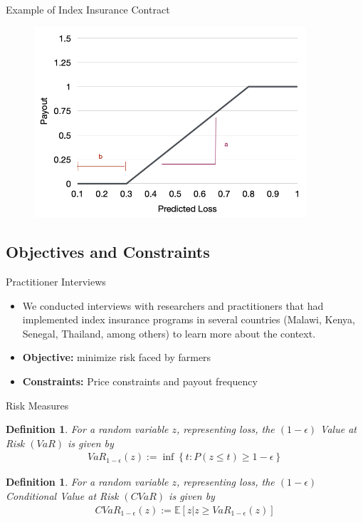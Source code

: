 \documentclass{beamer}
\newtheorem{defn}[theorem]{Definition}
\begin{document}
\begin{frame}{Example of Index Insurance Contract}
    \begin{figure}
        \includegraphics[width=0.9\textwidth]{../../../output/figures/Presentation/sample_insurance_contract.png}
    \end{figure}
\end{frame}

\subsection{Objectives and Constraints}
\begin{frame}{Practitioner Interviews}
\begin{itemize}
   \setlength\itemsep{2em}
    \item We conducted interviews with researchers and practitioners that had implemented index insurance programs in several countries (Malawi, Kenya, Senegal, Thailand, among others) to learn more about the context. 
    \item \textbf{Objective:} minimize risk faced by farmers
    \item \textbf{Constraints:} Price constraints and payout frequency
\end{itemize}    
\end{frame}


\begin{frame}{Risk Measures}

\begin{defn}
    For a random variable $z$, representing loss, the $(1-\epsilon)$ Value at Risk $(VaR)$ is given by 
    \begin{align*}
      VaR_{1-\epsilon}(z) := \inf \left \{ t : P(z \leq t) \geq 1-\epsilon \right \}
    \end{align*}
  \end{defn}

  \begin{defn}
    For a random variable $z$, representing loss, the $(1-\epsilon)$ Conditional Value at Risk $(CVaR)$ is given by 
    \begin{align*}
      CVaR_{1-\epsilon}(z) := \mathbb{E}\left [z | z \geq VaR_{1-\epsilon}(z) \right ]
    \end{align*}
  \end{defn}
\end{frame}
\end{document}
